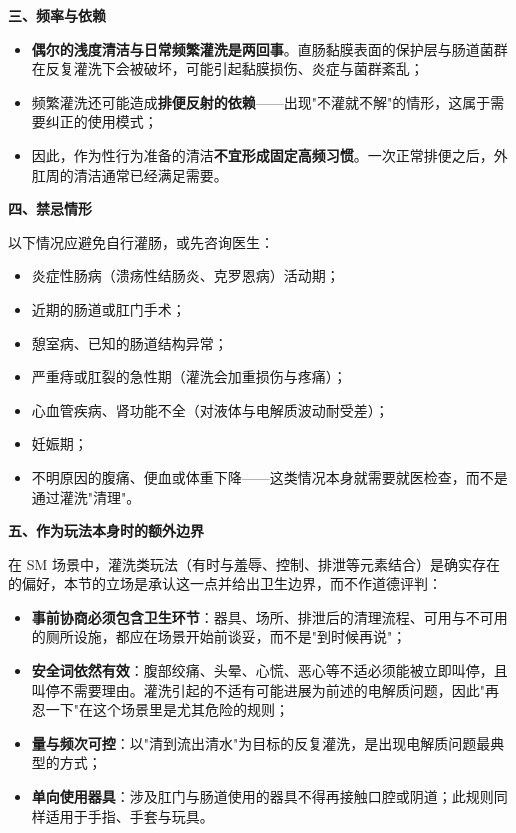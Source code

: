 \textbf{三、频率与依赖}

\begin{itemize}
\item \textbf{偶尔的浅度清洁与日常频繁灌洗是两回事}。直肠黏膜表面的保护层与肠道菌群在反复灌洗下会被破坏，可能引起黏膜损伤、炎症与菌群紊乱；
\item 频繁灌洗还可能造成\textbf{排便反射的依赖}——出现"不灌就不解"的情形，这属于需要纠正的使用模式；
\item 因此，作为性行为准备的清洁\textbf{不宜形成固定高频习惯}。一次正常排便之后，外肛周的清洁通常已经满足需要。
\end{itemize}

\textbf{四、禁忌情形}

以下情况应避免自行灌肠，或先咨询医生：

\begin{itemize}
\item 炎症性肠病（溃疡性结肠炎、克罗恩病）活动期；
\item 近期的肠道或肛门手术；
\item 憩室病、已知的肠道结构异常；
\item 严重痔或肛裂的急性期（灌洗会加重损伤与疼痛）；
\item 心血管疾病、肾功能不全（对液体与电解质波动耐受差）；
\item 妊娠期；
\item 不明原因的腹痛、便血或体重下降——这类情况本身就需要就医检查，而不是通过灌洗"清理"。
\end{itemize}

\textbf{五、作为玩法本身时的额外边界}

在 SM 场景中，灌洗类玩法（有时与羞辱、控制、排泄等元素结合）是确实存在的偏好，本节的立场是承认这一点并给出卫生边界，而不作道德评判：

\begin{itemize}
\item \textbf{事前协商必须包含卫生环节}：器具、场所、排泄后的清理流程、可用与不可用的厕所设施，都应在场景开始前谈妥，而不是"到时候再说"；
\item \textbf{安全词依然有效}：腹部绞痛、头晕、心慌、恶心等不适必须能被立即叫停，且叫停不需要理由。灌洗引起的不适有可能进展为前述的电解质问题，因此"再忍一下"在这个场景里是尤其危险的规则；
\item \textbf{量与频次可控}：以"清到流出清水"为目标的反复灌洗，是出现电解质问题最典型的方式；
\item \textbf{单向使用器具}：涉及肛门与肠道使用的器具不得再接触口腔或阴道；此规则同样适用于手指、手套与玩具。
\end{itemize}

